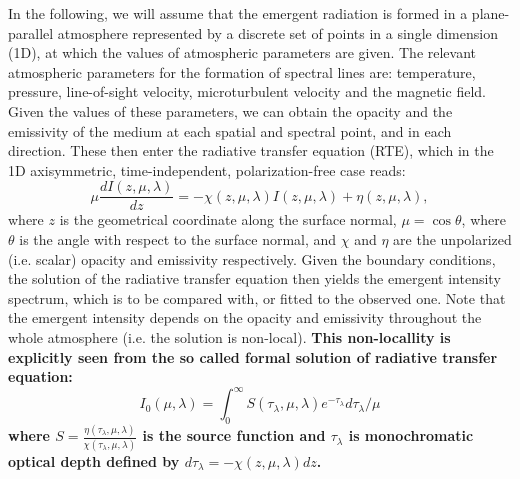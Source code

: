 \documentclass{aa}
\begin{document}
In the following, we will assume that the emergent radiation is formed in a plane-parallel atmosphere represented by a discrete set of points in a single dimension (1D), at which the values of atmospheric parameters are given. The relevant atmospheric parameters for the formation of spectral lines are: temperature, pressure, line-of-sight 	velocity, microturbulent velocity and the magnetic field. Given the values of these parameters, we can obtain the opacity and the emissivity of the medium at each spatial and spectral point, and in each direction. These then enter the radiative transfer equation (RTE), which in the 1D axisymmetric, time-independent, polarization-free case reads:
\begin{equation}
 \mu \frac{dI(z,\mu,\lambda)}{dz} = -\chi(z,\mu,\lambda) I(z,\mu,\lambda) + \eta(z,\mu,\lambda),
 \label{rte}
\end{equation}
where $z$ is the geometrical coordinate along the surface normal, $\mu = \cos \theta$, where $\theta$ is the angle with respect to the surface normal, and $\chi$ and $\eta$ are the unpolarized (i.e. scalar) opacity and emissivity respectively. Given the boundary conditions, the solution of the radiative transfer equation then yields the emergent intensity spectrum, which is to be compared with, or fitted to the observed one. Note that the emergent intensity depends on the opacity and emissivity throughout the whole atmosphere (i.e. the solution is non-local). \textbf{This non-locallity is explicitly seen from the so called formal solution of radiative transfer equation:
\begin{equation}
 I_0(\mu,\lambda) = \int_0^{\infty} S(\tau_{\lambda},\mu,\lambda) e^{-\tau_{\lambda}} d\tau_{\lambda} / \mu
\end{equation}
where $S=\frac{\eta(\tau_{\lambda},\mu,\lambda)}{\chi(\tau_{\lambda},\mu,\lambda)}$ is the source function and $\tau_{\lambda}$ is monochromatic optical depth defined by $d\tau_{\lambda} = -\chi(z,\mu,\lambda)dz$.}
\end{document}
